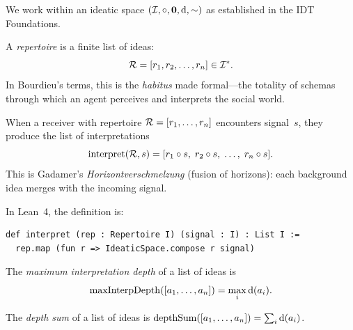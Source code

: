We work within an ideatic space $(\mathcal{I}, \circ, \mathbf{0}, \operatorname{d}, \sim)$
as established in the IDT Foundations.

\begin{definition}[Repertoire]
\label{def:repertoire}
A \emph{repertoire} is a finite list of ideas:
\[
  \mathcal{R} = [r_1, r_2, \ldots, r_n] \in \mathcal{I}^{*}.
\]
In Bourdieu's terms, this is the \emph{habitus} made formal---the
totality of schemas through which an agent perceives and interprets the
social world.
\end{definition}

\begin{definition}[Interpretation]
\label{def:interpretation}
When a receiver with repertoire $\mathcal{R} = [r_1, \ldots, r_n]$ encounters
signal~$s$, they produce the list of interpretations
\[
  \operatorname{interpret}(\mathcal{R}, s) 
  = [r_1 \circ s,\; r_2 \circ s,\; \ldots,\; r_n \circ s].
\]
This is Gadamer's \emph{Horizontverschmelzung} (fusion of horizons):
each background idea merges with the incoming signal.
\end{definition}

In Lean~4, the definition is:

\begin{lstlisting}[caption={Interpretation in Lean~4},label=lst:interpret]
def interpret (rep : Repertoire I) (signal : I) : List I :=
  rep.map (fun r => IdeaticSpace.compose r signal)
\end{lstlisting}

\begin{definition}
\label{def:maxinterpdepth}
The \emph{maximum interpretation depth} of a list of ideas is
\[
  \operatorname{maxInterpDepth}([a_1, \ldots, a_n])
  = \max_{i} \operatorname{d}(a_i).
\]
\end{definition}

\begin{definition}
\label{def:depthsum}
The \emph{depth sum} of a list of ideas is
$\operatorname{depthSum}([a_1, \ldots, a_n]) = \sum_i \operatorname{d}(a_i)$.
\end{definition}

